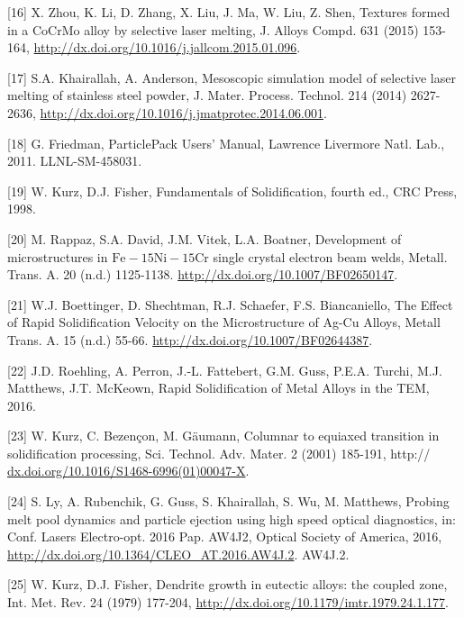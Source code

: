 \documentclass[10pt]{article}
\begin{document}
[16] X. Zhou, K. Li, D. Zhang, X. Liu, J. Ma, W. Liu, Z. Shen, Textures formed in a CoCrMo alloy by selective laser melting, J. Alloys Compd. 631 (2015) 153-164, \href{http://dx.doi.org/10.1016/j.jallcom.2015.01.096}{http://dx.doi.org/10.1016/j.jallcom.2015.01.096}.

[17] S.A. Khairallah, A. Anderson, Mesoscopic simulation model of selective laser melting of stainless steel powder, J. Mater. Process. Technol. 214 (2014) 2627-2636, \href{http://dx.doi.org/10.1016/j.jmatprotec.2014.06.001}{http://dx.doi.org/10.1016/j.jmatprotec.2014.06.001}.

[18] G. Friedman, ParticlePack Users' Manual, Lawrence Livermore Natl. Lab., 2011. LLNL-SM-458031.

[19] W. Kurz, D.J. Fisher, Fundamentals of Solidification, fourth ed., CRC Press, 1998.

[20] M. Rappaz, S.A. David, J.M. Vitek, L.A. Boatner, Development of microstructures in $\mathrm{Fe}-15 \mathrm{Ni}-15 \mathrm{Cr}$ single crystal electron beam welds, Metall. Trans. A. 20 (n.d.) 1125-1138. \href{http://dx.doi.org/10.1007/BF02650147}{http://dx.doi.org/10.1007/BF02650147}.

[21] W.J. Boettinger, D. Shechtman, R.J. Schaefer, F.S. Biancaniello, The Effect of Rapid Solidification Velocity on the Microstructure of Ag-Cu Alloys, Metall Trans. A. 15 (n.d.) 55-66. \href{http://dx.doi.org/10.1007/BF02644387}{http://dx.doi.org/10.1007/BF02644387}.

[22] J.D. Roehling, A. Perron, J.-L. Fattebert, G.M. Guss, P.E.A. Turchi, M.J. Matthews, J.T. McKeown, Rapid Solidification of Metal Alloys in the TEM, 2016.

[23] W. Kurz, C. Bezençon, M. Gäumann, Columnar to equiaxed transition in solidification processing, Sci. Technol. Adv. Mater. 2 (2001) 185-191, http:// \href{http://dx.doi.org/10.1016/S1468-6996(01)00047-X}{dx.doi.org/10.1016/S1468-6996(01)00047-X}.

[24] S. Ly, A. Rubenchik, G. Guss, S. Khairallah, S. Wu, M. Matthews, Probing melt pool dynamics and particle ejection using high speed optical diagnostics, in: Conf. Lasers Electro-opt. 2016 Pap. AW4J2, Optical Society of America, 2016, \href{http://dx.doi.org/10.1364/CLEO_AT.2016.AW4J.2}{http://dx.doi.org/10.1364/CLEO\_AT.2016.AW4J.2}. AW4J.2.

[25] W. Kurz, D.J. Fisher, Dendrite growth in eutectic alloys: the coupled zone, Int. Met. Rev. 24 (1979) 177-204, \href{http://dx.doi.org/10.1179/imtr.1979.24.1.177}{http://dx.doi.org/10.1179/imtr.1979.24.1.177}.
\end{document}

